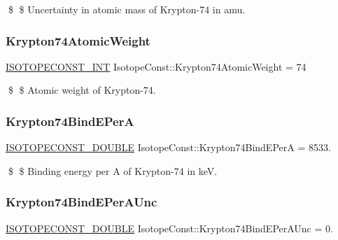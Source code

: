 \$ \$ Uncertainty in atomic mass of Krypton-\/74 in amu. \mbox{\label{group___isotope_const-_krypton-_kr74_ga8d924f93e7b4d407aa53627b4cce9c3c}} 
\subsubsection{\texorpdfstring{Krypton74\+Atomic\+Weight}{Krypton74AtomicWeight}}
{\footnotesize\ttfamily \mbox{\hyperlink{group___isotope_const-_macros_ga5f18360b3e99483a35c32d789e62621c}{I\+S\+O\+T\+O\+P\+E\+C\+O\+N\+S\+T\+\_\+\+I\+NT}} Isotope\+Const\+::\+Krypton74\+Atomic\+Weight = 74}

\$ \$ Atomic weight of Krypton-\/74. \mbox{\label{group___isotope_const-_krypton-_kr74_ga1ab0a68c0b6f8e5c511c8dd639300e70}} 
\subsubsection{\texorpdfstring{Krypton74\+Bind\+E\+PerA}{Krypton74BindEPerA}}
{\footnotesize\ttfamily \mbox{\hyperlink{group___isotope_const-_macros_ga8f45a7272ce02c0b4c65c44636ed719a}{I\+S\+O\+T\+O\+P\+E\+C\+O\+N\+S\+T\+\_\+\+D\+O\+U\+B\+LE}} Isotope\+Const\+::\+Krypton74\+Bind\+E\+PerA = 8533.}

\$ \$ Binding energy per A of Krypton-\/74 in keV. \mbox{\label{group___isotope_const-_krypton-_kr74_ga02399ff73411650da286942c9851591d}} 
\subsubsection{\texorpdfstring{Krypton74\+Bind\+E\+Per\+A\+Unc}{Krypton74BindEPerAUnc}}
{\footnotesize\ttfamily \mbox{\hyperlink{group___isotope_const-_macros_ga8f45a7272ce02c0b4c65c44636ed719a}{I\+S\+O\+T\+O\+P\+E\+C\+O\+N\+S\+T\+\_\+\+D\+O\+U\+B\+LE}} Isotope\+Const\+::\+Krypton74\+Bind\+E\+Per\+A\+Unc = 0.}

